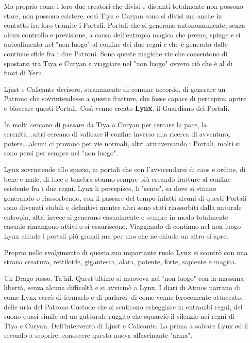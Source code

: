 \documentclass[a4paper,11pt,twoside,openany]{book}
\begin{document}
{Ma proprio come i loro due creatori che divisi e distanti totalmente non possono stare, non possono esistere, così Tiya e Curyan sono sì divisi ma anche in contatto fra loro tramite i Portali. Portali che si generano autonomamente, senza alcun controllo e previsione, a causa dell'entropia magica che preme, spinge e si autoalimenta nel "non luogo" al confine dei due regni e che è generata dalle continue sfide fra i due Patroni. Sono queste magiche vie che consentono di spostarsi tra Tiya e Curyan e viaggiare nel "non luogo" ovvero ciò che è al di fuori di Yeru.

Ljust e Calicante decisero, stranamente di comune accordo, di generare un Patrono che sovrintendesse a queste fratture, che fosse capace di percepire, aprire e bloccare questi Portali. Così venne creato \textbf{Lynx}, il Guardiano dei Portali.

In molti cercano di passare da Tiya a Curyan per cercare la pace, la serenità...altri cercano di valicare il confine inverso alla ricerca di avventura, potere\ldots .alcuni ci provano per vie normali, altri attraversando i Portali, molti si sono persi per sempre nel "non luogo".

Lynx sovrintende allo spazio, ai portali che con l'avvicendarsi di caos e ordine, di bene e male, di luce e tenebra stanno sempre più creando fratture al confine esistente fra i due regni. Lynx li percepisce, li "sente", sa dove si stanno generando o riassorbendo, con il passare del tempo infatti alcuni di questi Portali sono divenuti stabili e definitivi mentre altri sono stati riassorbiti dalla naturale entropia, altri invece si generano casualmente e sempre in modo totalmente casuale rimangono attivi o si esauriscono. Viaggiando di continuo nel non luogo Lynx chiude i portali più grandi ma per uno che ne chiude un altro si apre.

Proprio nello svolgimento di questo suo importante ruolo Lynx si scontrò con una strana creatura, rettiloide, gigantesca, alata, potente, forte, sapiente e magica.

Un Drago rosso, Ta'hil. Quest'ultimo si muoveva nel "non luogo" con la massima libertà, senza alcuna difficoltà e si avvicinò a Lynx. I diari di Atmos narrano di come Lynx cercò di fermarlo e di parlarci, di come venne ferocemente attaccato, delle urla del Patrono Custode che si sentirono echeggiare in entrambi regni, del suono quasi simile ad un gutturale ruggito che squarciò il silenzio nei regni di Tiya e Curyan. Dell'intervento di Ljust e Calicante. La prima a salvare Lynx ed il secondo a scoprire, conoscere questa nuova affascinante "arma".

}
\end{document}
